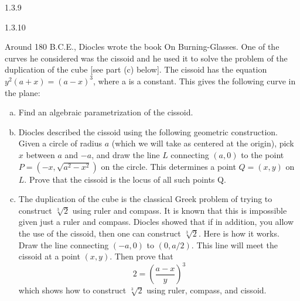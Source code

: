 \documentclass[twoside]{article}
\begin{document}
\newpage

\begin{ejercicio}{1.3.9}

\end{ejercicio}
\begin{solucion}

\end{solucion}

\newpage

\begin{ejercicio}{1.3.10}

\end{ejercicio} Around 180 B.C.E., Diocles wrote the book On Burning-Glasses. One of the curves he considered was the cissoid and he used it to solve the problem of the duplication of the cube [see part (c) below]. The cissoid has the equation $y^2(a + x) = (a − x)^3$, where a is
a constant. This gives the following curve in the plane:
\begin{enumerate}[a.]
\item Find an algebraic parametrization of the cissoid.
\item Diocles described the cissoid using the following geometric construction. Given a circle of radius $a$ (which we will take as centered at the origin), pick $x$ between $a$ and $−a$, and draw the line $L$ connecting $(a, 0)$ to the point $P = (−x,\sqrt{a^2 − x^2})$ on the
circle. This determines a point $Q = (x, y)$ on $L$. Prove that the cissoid is the locus of all such points Q.
\item The duplication of the cube is the classical Greek problem of trying to construct $\sqrt[3]{2}$ using ruler and compass. It is known that this is impossible given just a ruler and  compass. Diocles showed that if in addition, you allow the use of the cissoid, then
one can construct $\sqrt[3]{2}$. Here is how it works. Draw the line connecting $(−a, 0)$ to $(0, a/2)$. This line will meet the cissoid at a point $(x, y)$. Then prove that
$$
2=\left(\frac{a-x}{y}\right)^3
$$
which shows how to construct $\sqrt[3]{2}$ using ruler, compass, and cissoid.
\end{enumerate}
\end{document}
